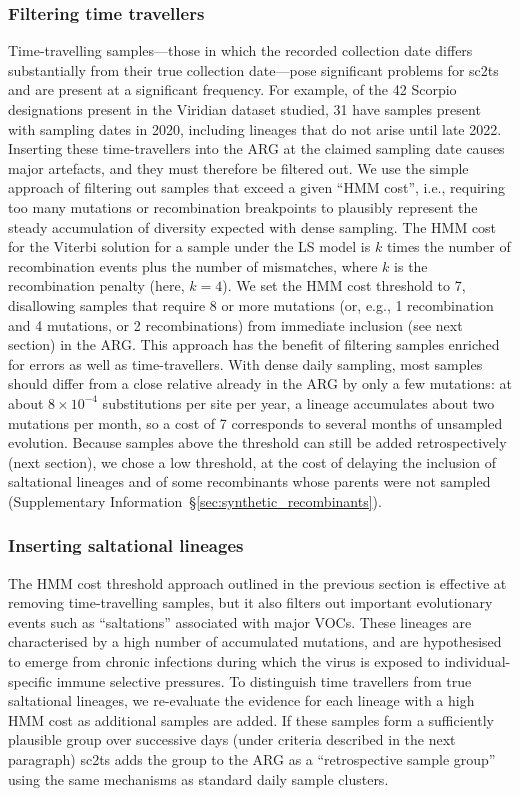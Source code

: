 \documentclass[12pt]{article}
\newcommand{\supref}[1]{Supplementary Information~\S\ref{#1}}
\begin{document}
\subsubsection*{Filtering time travellers}
Time-travelling samples---those in which the recorded collection date differs
substantially from their true collection date---pose significant problems
for sc2ts and are present at a significant frequency. For example, of the
42 Scorpio~\cite{Colquhoun2023scorpio}
designations present in the Viridian dataset studied, 31 have
samples present with sampling dates in 2020, including lineages that do not
arise until late 2022. Inserting these time-travellers into the ARG
at the claimed sampling date causes major artefacts, and they must therefore be
filtered out. We use the simple approach of filtering out samples that
exceed a given ``HMM cost'', i.e., requiring too many mutations or
recombination breakpoints to plausibly represent the steady accumulation
of diversity expected with dense sampling.
The HMM cost for the Viterbi solution for a sample under the LS model
is $k$ times the number of recombination events plus the number of
mismatches, where $k$ is the recombination penalty (here, $k=4$).
We set the HMM cost threshold to 7,
disallowing samples that require 8 or more mutations (or, e.g., 1 recombination
and 4 mutations, or 2 recombinations) from immediate inclusion (see next
section) in the ARG. This approach has the benefit of filtering
samples enriched for errors as well as time-travellers.
With dense daily sampling, most samples should differ from a close relative
already in the ARG by only a few mutations:
at about $8\times10^{-4}$ substitutions per site per year,
a lineage accumulates about two mutations per month,
so a cost of 7 corresponds to several months of unsampled evolution.
Because samples above the threshold can still be added retrospectively (next section),
we chose a low threshold, at the cost of delaying the inclusion of saltational lineages
and of some recombinants whose parents were not sampled
(\supref{sec:synthetic_recombinants}).

\subsubsection*{Inserting saltational lineages}
The HMM cost threshold approach outlined in the previous section is
effective at removing time-travelling samples, but it also filters out
important evolutionary events such as
``saltations'' associated with major VOCs.
These lineages are characterised by a high number of accumulated mutations,
and are hypothesised to emerge from chronic infections
during which the virus is exposed to individual-specific immune selective
pressures\cite{Otto2021origins,Markov2023}.
To distinguish time travellers from true saltational lineages,
we re-evaluate the evidence for each lineage with a high HMM cost
as additional samples are added.
If these samples form a sufficiently plausible group over successive days
(under criteria described in the next paragraph)
sc2ts adds the group to the ARG as a
``retrospective sample group'' using the same mechanisms
as standard daily sample clusters.
\end{document}
